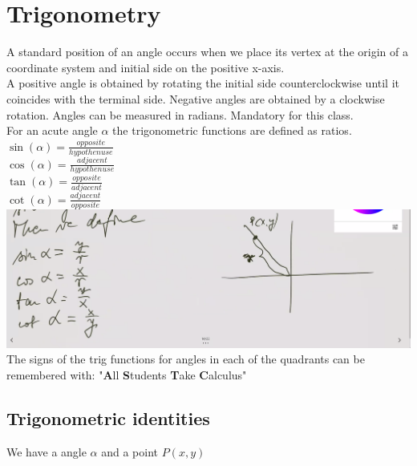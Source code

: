 \documentclass{article}
\begin{document}
	\section{Trigonometry}
	A standard position of an angle occurs when we place its vertex at the origin of a coordinate system and initial side on the positive x-axis. \\
	A positive angle is obtained by rotating the initial side counterclockwise until it coincides with the terminal side. Negative angles are obtained by a clockwise rotation. Angles can be measured in radians. Mandatory for this class. \\
	For an acute angle $\alpha$ the trigonometric functions are defined as ratios. \\
	$\sin(\alpha) = \frac{opposite}{hypothenuse}$ \\
	$\cos(\alpha) = \frac{adjacent}{hypothenuse}$ \\
	$\tan(\alpha) = \frac{opposite}{adjacent}$ \\
	$\cot(\alpha) = \frac{adjacent}{opposite}$ \\
	\includegraphics[scale=0.2]{2.png} 
	The signs of the trig functions for angles in each of the quadrants can be remembered with: "\textbf{A}ll \textbf{S}tudents \textbf{T}ake \textbf{C}alculus"
	\pagebreak
	\subsection{Trigonometric identities}
	We have a angle $\alpha$ and a point $P(x, y)$\\
	
\end{document}
